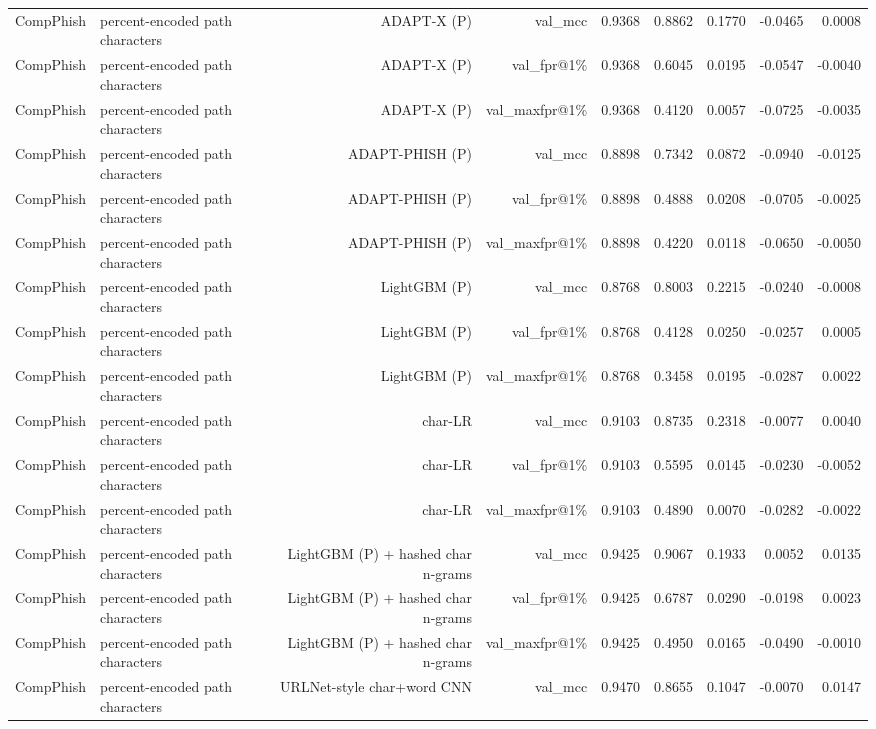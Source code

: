 \begin{table}[t]
\begin{tabular}{llrrrrrrr}
CompPhish & percent-encoded path characters & ADAPT-X (P) & val\_mcc & 0.9368 & 0.8862 & 0.1770 & -0.0465 & 0.0008 \\
CompPhish & percent-encoded path characters & ADAPT-X (P) & val\_fpr@1\% & 0.9368 & 0.6045 & 0.0195 & -0.0547 & -0.0040 \\
CompPhish & percent-encoded path characters & ADAPT-X (P) & val\_maxfpr@1\% & 0.9368 & 0.4120 & 0.0057 & -0.0725 & -0.0035 \\
CompPhish & percent-encoded path characters & ADAPT-PHISH (P) & val\_mcc & 0.8898 & 0.7342 & 0.0872 & -0.0940 & -0.0125 \\
CompPhish & percent-encoded path characters & ADAPT-PHISH (P) & val\_fpr@1\% & 0.8898 & 0.4888 & 0.0208 & -0.0705 & -0.0025 \\
CompPhish & percent-encoded path characters & ADAPT-PHISH (P) & val\_maxfpr@1\% & 0.8898 & 0.4220 & 0.0118 & -0.0650 & -0.0050 \\
CompPhish & percent-encoded path characters & LightGBM (P) & val\_mcc & 0.8768 & 0.8003 & 0.2215 & -0.0240 & -0.0008 \\
CompPhish & percent-encoded path characters & LightGBM (P) & val\_fpr@1\% & 0.8768 & 0.4128 & 0.0250 & -0.0257 & 0.0005 \\
CompPhish & percent-encoded path characters & LightGBM (P) & val\_maxfpr@1\% & 0.8768 & 0.3458 & 0.0195 & -0.0287 & 0.0022 \\
CompPhish & percent-encoded path characters & char-LR & val\_mcc & 0.9103 & 0.8735 & 0.2318 & -0.0077 & 0.0040 \\
CompPhish & percent-encoded path characters & char-LR & val\_fpr@1\% & 0.9103 & 0.5595 & 0.0145 & -0.0230 & -0.0052 \\
CompPhish & percent-encoded path characters & char-LR & val\_maxfpr@1\% & 0.9103 & 0.4890 & 0.0070 & -0.0282 & -0.0022 \\
CompPhish & percent-encoded path characters & LightGBM (P) + hashed char n-grams & val\_mcc & 0.9425 & 0.9067 & 0.1933 & 0.0052 & 0.0135 \\
CompPhish & percent-encoded path characters & LightGBM (P) + hashed char n-grams & val\_fpr@1\% & 0.9425 & 0.6787 & 0.0290 & -0.0198 & 0.0023 \\
CompPhish & percent-encoded path characters & LightGBM (P) + hashed char n-grams & val\_maxfpr@1\% & 0.9425 & 0.4950 & 0.0165 & -0.0490 & -0.0010 \\
CompPhish & percent-encoded path characters & URLNet-style char+word CNN & val\_mcc & 0.9470 & 0.8655 & 0.1047 & -0.0070 & 0.0147 \\

\end{tabular}
\end{table}
